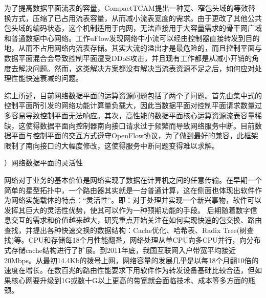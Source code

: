 为了提高数据平面流表的容量，CompactTCAM\cite{kannan2013compact}提出一种宽、窄包头域的等效替换方式，压缩了已占用流表容量，从而减小流表宽度的需求。由于更改了其他公共包头域的编码状态，这个机制适用于内网，无法直接用于大容量需求的骨干网广域和普通数据中心网络。工作uFlow\cite{zhengpeng2018uflow}发现网络中小流可以经由控制器直接转发到目的地，从而不占用网络内流表存储。其实大流的溢出才是最危险的，而且控制平面与数据平面混合会导致控制平面遭受DDoS攻击，并且现有工作都是从减小开销的角度去解决问题。然而，这类解决方案都没有解决当流表资源不足之后，如何应对处理性能快速衰减的问题。

综上所述，目前网络数据平面的运算资源问题包括了两个子问题。首先由集中式的控制平面所引发的网络功能计算量负载大，因此当数据平面对控制平面请求数量过多容易导致控制平面无法响应。其次，高性能的数据平面核心运算资源流表容量稀缺，这使得数据平面向控制器南向接口请求过于频繁而导致网络服务中断。目前数据平面与控制平面的交互方式遵守OpenFlow协议，为了做到最好的兼容，此框架限制了南向接口的大幅度修改，这使得服务中断问题变得难以求解。



\label{chap122}

{）网络数据平面的灵活性}


网络对于业务的基本价值是网络实现了数据在计算机之间的任意传输。在早期一个简单的星型拓扑中，一个路由器其实就是一台普通计算，这在侧面也体现出软件作为网络实施载体的特点：“灵活性”。即：对于处理并实现一个新兴事物，软件可以发挥其巨大的灵活性优势，使其可以作为一种预期功能的手段。
后期随着数字信息交互的需求和价值越来越大，研究重点开始关注在如何实现快速的包交换、路由查找，并提出各种快速交换的数据结构：Cache优化、哈希表、Radix Tree(树查找)等。CPU和存储每18个月性能翻番，网络处理从单CPU向多CPU并行，向分布式存储cache结构进行了扩展。到2011年底，我国互联网入户带宽平均接近20Mbps。从最初14.4Kb的拨号上网，网络容量的发展几乎是以每18个月翻10倍的速度在增长。在数百兆的路由性能要求下用软件作为转发设备基础比较合适，但如果核心网要升级到1G或数十G以上更高的带宽就会面临技术、成本等多方面的瓶颈。






